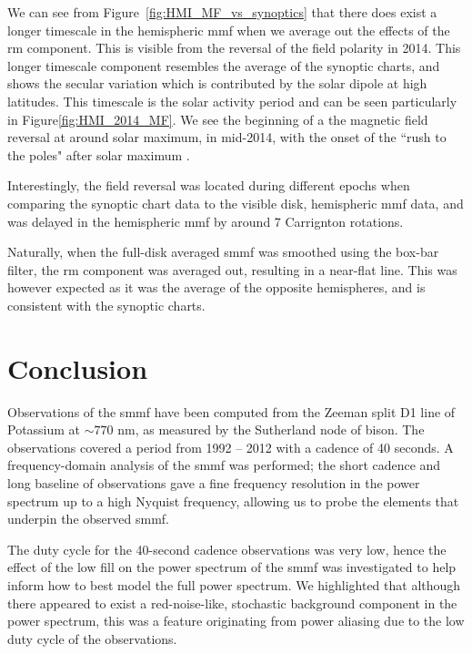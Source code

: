 We can see from Figure~\ref{fig:HMI_MF_vs_synoptics} that there does exist a longer timescale in the hemispheric \gls{mmf} when we average out the effects of the \gls{rm} component. This is visible from the reversal of the field polarity in 2014. This longer timescale component resembles the average of the synoptic charts, and shows the secular variation which is contributed by the solar dipole at high latitudes. This timescale is the solar activity period and can be seen particularly in Figure\ref{fig:HMI_2014_MF}. We see the beginning of a the magnetic field reversal at around solar maximum, in mid-2014, with the onset of the ``rush to the poles" after solar maximum \citep{wilson_solar_1994, mcintosh_what_2019}.

Interestingly, the field reversal was located during different epochs when comparing the synoptic chart data to the visible disk, hemispheric \gls{mmf} data, and was delayed in the hemispheric \gls{mmf} by around 7 Carrignton rotations.

Naturally, when the full-disk averaged \gls{smmf} was smoothed using the box-bar filter, the \gls{rm} component was averaged out, resulting in a near-flat line. This was however expected as it was the average of the opposite hemispheres, and is consistent with the synoptic charts.


\section{Conclusion}\label{sec:SMMF_conclusion}


Observations of the \gls{smmf} have been computed from the Zeeman split D1 line of Potassium at $\sim 770$ nm, as measured by the Sutherland node of \gls{bison}. The observations covered a period from 1992 -- 2012 with a cadence of 40 seconds. A frequency-domain analysis of the \gls{smmf} was performed; the short cadence and long baseline of observations gave a fine frequency resolution in the power spectrum up to a high Nyquist frequency, allowing us to probe the elements that underpin the observed \gls{smmf}.

The duty cycle for the 40-second cadence observations was very low, hence the effect of the low fill on the power spectrum of the \gls{smmf} was investigated to help inform how to best model the full power spectrum. We highlighted that although there appeared to exist a red-noise-like, stochastic background component in the power spectrum, this was a feature originating from power aliasing due to the low duty cycle of the observations.

